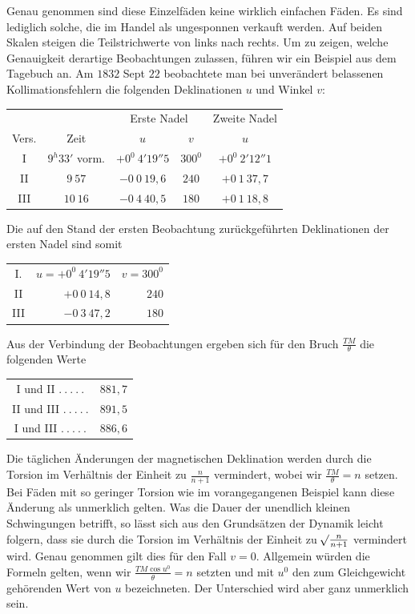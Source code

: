 \expandafter\def\csname HistoricalNoteText9\endcsname{Genau genommen sind diese Einzelfäden keine wirklich einfachen Fäden. Es sind lediglich solche, die im Handel als ungesponnen verkauft werden.}
\expandafter\def\csname HistoricalNoteText8\endcsname{Auf beiden Skalen steigen die Teilstrichwerte von links nach rechts.}
Um zu zeigen, welche Genauigkeit derartige Beobachtungen zulassen, führen wir ein Beispiel aus dem Tagebuch an. Am $1832$ Sept $22$ beobachtete man bei unverändert belassenen Kollimationsfehlern die folgenden Deklinationen $u$ und Winkel $v$:
\begin{center}
\begin{tabular}{c|c||c|c||c}
&&\multicolumn{2}{c||}{Erste Nadel}&Zweite Nadel\\
Vers.&Zeit&$u$&$v$&$u$\\\hline
I&$9^h33'$ vorm.&$+0^0\ 4'19''5$&$300^0$&$+0^0\ 2'12''1$\\
II&$9\ 57$&$-0\ 0\ 19{,}6$&$240$&$+0\ 1\ 37{,}7$\\
III&$10\ 16$&$-0\ 4\ 40{,}5$&$180$&$+0\ 1\ 18{,}8$
\end{tabular}
\end{center}
Die auf den Stand der ersten Beobachtung zurückgeführten Deklinationen der ersten Nadel sind somit
\begin{center}
\begin{tabular}{crr}
I.&$u=+0^0\ 4'19''5$&$v=300^0$\\
II&$+0\ 0\ 14{,}8$&$240$\\
III&$-0\ 3\ 47{,}2$&$180$
\end{tabular}
\end{center}
Aus der Verbindung der Beobachtungen ergeben sich für den Bruch $\frac{TM}{\theta}$ die folgenden Werte
\begin{center}
\begin{tabular}{cr}
I und II $.\ .\ .\ .\ .$&$881{,}7$\\
II und III $.\ .\ .\ .\ .$&$891{,}5$\\
I und III $.\ .\ .\ .\ .$&$886{,}6$
\end{tabular}
\end{center}

Die täglichen Änderungen der magnetischen Deklination werden durch die Torsion im Verhältnis der Einheit zu $\frac{n}{n+1}$ vermindert, wobei wir $\frac{TM}{\theta}=n$ setzen. Bei Fäden mit so geringer Torsion wie im vorangegangenen Beispiel kann diese Änderung als unmerklich gelten. Was die Dauer der unendlich kleinen Schwingungen betrifft, so lässt sich aus den Grundsätzen der Dynamik leicht folgern, dass sie durch die Torsion im Verhältnis der Einheit zu $\mathord{{}^{}\!\surd}\frac{n}{n+1}$ vermindert wird. Genau genommen gilt dies für den Fall $v=0$. Allgemein würden die Formeln gelten, wenn wir $\frac{TM\cos u^0}{\theta}=n$ setzten und mit $u^0$ den zum Gleichgewicht gehörenden Wert von $u$ bezeichneten. Der Unterschied wird aber ganz unmerklich sein.

